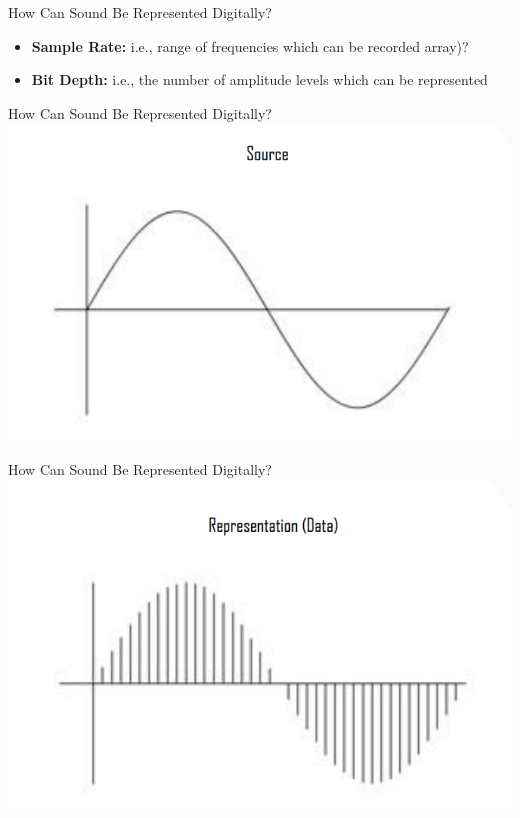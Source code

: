 \begin{frame}{How Can Sound Be Represented Digitally?}
	\begin{itemize}
		\pause\item\textbf{Sample Rate:} i.e., range of frequencies which can be recorded
		array)?

		\pause\item\textbf{Bit Depth:} i.e., the number of amplitude levels which can be
		represented 
	\end{itemize}
\end{frame}

\begin{frame}{How Can Sound Be Represented Digitally? }
	\includegraphics[width=\linewidth,height=0.7\textheight,keepaspectratio]{source_wave}
\end{frame}

\begin{frame}{How Can Sound Be Represented Digitally? }
	\includegraphics[width=\linewidth,height=0.7\textheight,keepaspectratio]{wave_data}
\end{frame}

